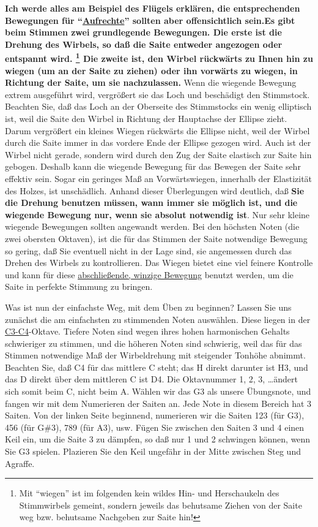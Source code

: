 {\normalsize \textbf{Ich werde alles am Beispiel des Flügels erklären, die entsprechenden Bewegungen für \enquote{\hyperlink{upright}{Aufrechte}} sollten aber offensichtlich sein.}}\textbf{Es gibt beim Stimmen zwei grundlegende Bewegungen.
 Die erste ist die Drehung des Wirbels, so daß die Saite entweder angezogen oder entspannt wird.
 \footnote{Mit \enquote{wiegen} ist im folgenden kein wildes Hin- und Herschaukeln des Stimmwirbels gemeint, sondern jeweils das behutsame Ziehen von der Saite weg bzw. behutsame Nachgeben zur Saite hin!}
 Die zweite ist, den Wirbel rückwärts zu Ihnen hin zu wiegen (um an der Saite zu ziehen) oder ihn vorwärts zu wiegen, in Richtung der Saite, um sie nachzulassen.}
 Wenn die wiegende Bewegung extrem ausgeführt wird, vergrößert sie das Loch und beschädigt den Stimmstock.
 Beachten Sie, daß das Loch an der Oberseite des Stimmstocks ein wenig elliptisch ist, weil die Saite den Wirbel in Richtung der Hauptachse der Ellipse zieht.
 Darum vergrößert ein kleines Wiegen rückwärts die Ellipse nicht, weil der Wirbel durch die Saite immer in das vordere Ende der Ellipse gezogen wird.
 Auch ist der Wirbel nicht gerade, sondern wird durch den Zug der Saite elastisch zur Saite hin gebogen.
 Deshalb kann die wiegende Bewegung für das Bewegen der Saite sehr effektiv sein.
 Sogar ein geringes Maß an Vorwärtswiegen, innerhalb der Elastizität des Holzes, ist unschädlich.
 Anhand dieser Überlegungen wird deutlich, daß \textbf{Sie die Drehung benutzen müssen, wann immer sie möglich ist, und die wiegende Bewegung nur, wenn sie absolut notwendig ist}.
 Nur sehr kleine wiegende Bewegungen sollten angewandt werden.
 Bei den höchsten Noten (die zwei obersten Oktaven), ist die für das Stimmen der Saite notwendige Bewegung so gering, daß Sie eventuell nicht in der Lage sind, sie angemessen durch das Drehen des Wirbels zu kontrollieren.
 Das Wiegen bietet eine viel feinere Kontrolle und kann für diese \hyperlink{c2_5_infi}{abschließende, winzige Bewegung} benutzt werden, um die Saite in perfekte Stimmung zu bringen.
 

Was ist nun der einfachste Weg, mit dem Üben zu beginnen?
 Lassen Sie uns zunächst die am einfachsten zu stimmenden Noten auswählen.
 Diese liegen in der \hyperlink{Noten}{C3-C4}-Oktave.
 Tiefere Noten sind wegen ihres hohen harmonischen Gehalts schwieriger zu stimmen, und die höheren Noten sind schwierig, weil das für das Stimmen notwendige Maß der Wirbeldrehung mit steigender Tonhöhe abnimmt.
 Beachten Sie, daß C4 für das mittlere C steht; das H direkt darunter ist H3, und das D direkt über dem mittleren C ist D4.
 Die Oktavnummer 1, 2, 3, \ldots ändert sich somit beim C, nicht beim A.
 Wählen wir das G3 als unsere Übungsnote, und fangen wir mit dem Numerieren der Saiten an.
 Jede Note in diesem Bereich hat 3 Saiten.
 Von der linken Seite beginnend, numerieren wir die Saiten 123 (für G3), 456 (für G\#3), 789 (für A3), usw.
 Fügen Sie zwischen den Saiten 3 und 4 einen Keil ein, um die Saite 3 zu dämpfen, so daß nur 1 und 2 schwingen können, wenn Sie G3 spielen.
 Plazieren Sie den Keil ungefähr in der Mitte zwischen Steg und Agraffe.
 

